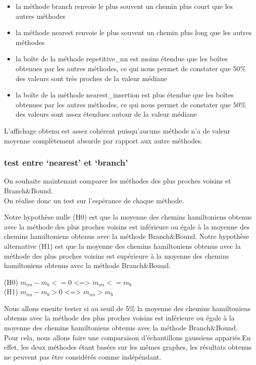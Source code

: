 \documentclass[
]{article}
\providecommand{\tightlist}{%
  \setlength{\itemsep}{0pt}\setlength{\parskip}{0pt}}
\begin{document}
\begin{itemize}
\tightlist
\item
  la méthode branch renvoie le plus souvent un chemin plus court que les
  autres méthodes
\item
  la méthode nearest renvoie le plus souvent un chemin plus long que les
  autres méthodes
\item
  la boîte de la méthode repetitive\_nn est moins étendue que les boîtes
  obtenues par les autres méthodes, ce qui nous permet de constater que
  50\% des valeurs sont très proches de la valeur médiane
\item
  la boîte de la méthode nearest\_insertion est plus étendue que les
  boîtes obtenues par les autres méthodes, ce qui nous permet de
  constater que 50\% des valeurs sont assez étendues autour de la valeur
  médiane
\end{itemize}

L'affichage obtenu est assez cohérent puisqu'aucune méthode n'a de
valeur moyenne complètement absurde par rapport aux autre méthodes.

\hypertarget{test-entre-nearest-et-branch}{%
\subsubsection{test entre `nearest' et
`branch'}\label{test-entre-nearest-et-branch}}

On souhaite maintenant comparer les méthodes des plus proches voisins et
Branch\&Bound.\\
On réalise donc un test sur l'espérance de chaque méthode.

Notre hypothèse nulle (H0) est que la moyenne des chemins hamiltoniens
obtenus avec la méthode des plus proches voisins est inférieure ou égale
à la moyenne des chemins hamiltoniens obtenus avec la méthode
Branch\&Bound. Notre hypothèse alternative (H1) est que la moyenne des
chemins hamiltoniens obtenus avec la méthode des plus proches voisins
est supérieure à la moyenne des chemins hamiltoniens obtenus avec la
méthode Branch\&Bound.

(H0) \(m_{nn} - m_b <= 0\) \textless=\textgreater{} \(m_{nn} <= m_b\)\\
(H1) \(m_{nn} - m_b > 0\) \textless=\textgreater{} \(m_{nn} > m_b\)

Nous allons ensuite tester si au seuil de 5\% la moyenne des chemins
hamiltoniens obtenus avec la méthode des plus proches voisins est
inférieure ou égale à la moyenne des chemins hamiltoniens obtenus avec
la méthode Branch\&Bound.\\
Pour cela, nous allons faire une comparaison d'échantillons gaussiens
appariés.En effet, les deux méthodes étant basées sur les mêmes graphes,
les résultats obtenus ne peuvent pas être considérés comme indépéndant.
\end{document}
